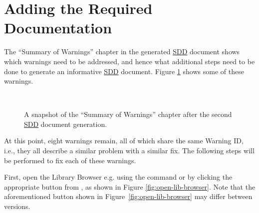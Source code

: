 \documentclass{mcscert}
\begin{document}
\section*{Adding the Required Documentation}
The ``Summary of Warnings'' chapter in the generated \hyperref[acr:sdd]{SDD} document shows which warnings need to be addressed, and hence what additional steps need to be done to generate an informative \hyperref[acr:sdd]{SDD} document. 
Figure \ref{fig:summary-of-warnings-2} shows some of these warnings.

\begin{figure}
	\caption{A snapshot of the ``Summary of Warnings'' chapter after the second \hyperref[acr:sdd]{SDD}	document generation.}
	\centering
	\label{fig:summary-of-warnings-2}
	\\
\end{figure}

At this point, eight warnings remain, all of which share the same Warning ID, i.e., they all describe a similar problem with a similar fix.
The following steps will be performed to fix each of these warnings.

First, open the Library Browser e.g. using the  command or by clicking the appropriate button from \simulink{}, as shown in Figure \ref{fig:open-lib-browser}. 
Note that the aforementioned button shown in Figure~\ref{fig:open-lib-browser}
may differ between \matlab{} versions.
\end{document}

